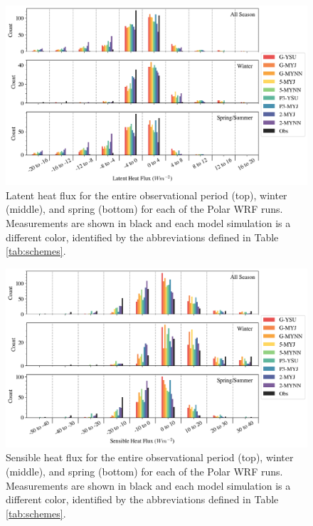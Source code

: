 \begin{figure}[t]
    \centering
    \includegraphics[width=1\linewidth]{figures/chapter3/WRF_LHF_Histo.png}
    \caption[Polar WRF simulated latent heat flux histograms.]{Latent heat flux for the entire observational period (top), winter (middle), and spring (bottom) for each of the Polar WRF runs. Measurements are shown in black and each model simulation is a different color, identified by the abbreviations defined in Table \ref{tab:schemes}.}
    \label{fig:wrf_hlf}
\end{figure}

\begin{figure}[h]
    \centering
    \includegraphics[width=1\linewidth]{figures/chapter3/WRF_SHF_Histo.png}
    \caption[Polar WRF simulated sensible heat flux histograms.]{Sensible heat flux for the entire observational period (top), winter (middle), and spring (bottom) for each of the Polar WRF runs. Measurements are shown in black and each model simulation is a different color, identified by the abbreviations defined in Table \ref{tab:schemes}.}
    \label{fig:wrf_shf}
\end{figure}

